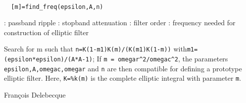 
\begin{mandesc}
   \\ %
\end{mandesc}
\begin{calling_sequence}
\begin{verbatim}
  [m]=find_freq(epsilon,A,n)  
\end{verbatim}
\end{calling_sequence}
\begin{parameters}
  \begin{varlist}
    : passband ripple
    : stopband attenuation
    : filter order
    : frequency needed for construction of elliptic filter
  \end{varlist}
\end{parameters}
\begin{mandescription}
  Search for m such that \verb!n=K(1-m1)K(m)/(K(m1)K(1-m))!
  with\verb!m1=(epsilon*epsilon)/(A*A-1)!;
  If \verb!m = omegar^2/omegac^2!, the parameters
  \verb!epsilon,A,omegac,omegar! and \verb!n! are then
  compatible for defining a prototype elliptic filter.
  Here, \verb!K=%k(m)! is the complete elliptic integral with parameter \verb!m!.
\end{mandescription}
\begin{manseealso}
\end{manseealso}
\begin{authors}
  Fran\c{c}ois  Delebecque  
\end{authors}
